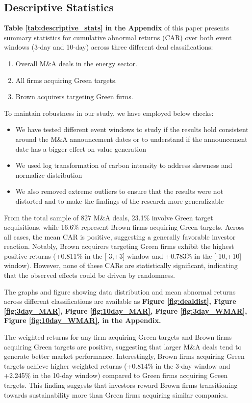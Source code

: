 \documentclass[a4paper]{article}
\begin{document}
\subsection{Descriptive Statistics}
\textbf{Table \ref{tab:descriptive_stats} in the Appendix} of this paper presents summary statistics for cumulative abnormal returns (CAR) over both event windows (3-day and 10-day) across three different deal classifications:
\begin{enumerate}
\setlength{\itemsep}{0pt} 
\item Overall M\&A deals in the energy sector.
\item All firms acquiring Green targets.
\item Brown acquirers targeting Green firms.
\end{enumerate}

To maintain robustness in our study, we have employed below checks:
\begin{itemize}
\setlength{\itemsep}{0pt}
    \item  We have tested different event windows to study if the results hold consistent around the M\&A announcement dates or to understand if the announcement date has a bigger effect on value generation
    \item We used log transformation of carbon intensity to address skewness and normalize distribution
    \item We also removed extreme outliers to ensure that the results were not distorted and to make the findings of the research more generalizable
\end{itemize}

From the total sample of 827 M\&A deals, 23.1\% involve Green target acquisitions, while 16.6\% represent Brown firms acquiring Green targets. Across all cases, the mean CAR is positive, suggesting a generally favorable investor reaction. Notably, Brown acquirers targeting Green firms exhibit the highest positive returns (+0.811\% in the [-3,+3] window and +0.783\% in the [-10,+10] window). However, none of these CARs are statistically significant, indicating that the observed effects could be driven by randomness.

The graphs and figure showing data distribution and mean abnormal returns across different classifications are available as \textbf{Figure \ref{fig:dealdist}, Figure \ref{fig:3day_MAR}, Figure \ref{fig:10day_MAR}, Figure \ref{fig:3day_WMAR}, Figure \ref{fig:10day_WMAR},  in the Appendix.} 

The weighted returns for any firm acquiring Green targets and Brown firms acquiring Green targets are positive, suggesting that larger M\&A deals tend to generate better market performance. Interestingly, Brown firms acquiring Green targets achieve higher weighted returns (+0.814\% in the 3-day window and +2.245\% in the 10-day window) compared to Green firms acquiring Green targets. This finding suggests that investors reward Brown firms transitioning towards sustainability more than Green firms acquiring similar companies.
\end{document}
